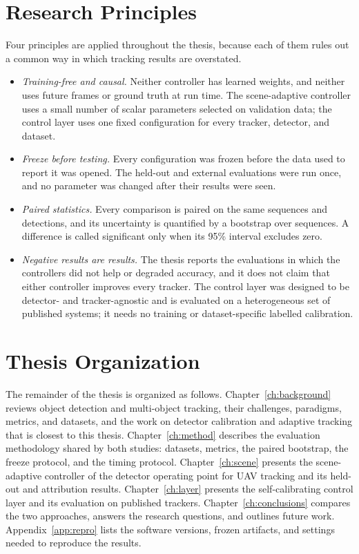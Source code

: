 \section{Research Principles}
Four principles are applied throughout the thesis, because each of them rules out a common way in which tracking results are overstated.
\begin{itemize}
\item \emph{Training-free and causal.} Neither controller has learned weights, and neither uses future frames or ground truth at run time. The scene-adaptive controller uses a small number of scalar parameters selected on validation data; the control layer uses one fixed configuration for every tracker, detector, and dataset.
\item \emph{Freeze before testing.} Every configuration was frozen before the data used to report it was opened. The held-out and external evaluations were run once, and no parameter was changed after their results were seen.
\item \emph{Paired statistics.} Every comparison is paired on the same sequences and detections, and its uncertainty is quantified by a bootstrap over sequences. A difference is called significant only when its 95\% interval excludes zero.
\item \emph{Negative results are results.} The thesis reports the evaluations in which the controllers did not help or degraded accuracy, and it does not claim that either controller improves every tracker. The control layer was designed to be detector- and tracker-agnostic and is evaluated on a heterogeneous set of published systems; it needs no training or dataset-specific labelled calibration.
\end{itemize}

\section{Thesis Organization}
The remainder of the thesis is organized as follows. Chapter~\ref{ch:background} reviews object detection and multi-object tracking, their challenges, paradigms, metrics, and datasets, and the work on detector calibration and adaptive tracking that is closest to this thesis. Chapter~\ref{ch:method} describes the evaluation methodology shared by both studies: datasets, metrics, the paired bootstrap, the freeze protocol, and the timing protocol. Chapter~\ref{ch:scene} presents the scene-adaptive controller of the detector operating point for UAV tracking and its held-out and attribution results. Chapter~\ref{ch:layer} presents the self-calibrating control layer and its evaluation on published trackers. Chapter~\ref{ch:conclusions} compares the two approaches, answers the research questions, and outlines future work. Appendix~\ref{app:repro} lists the software versions, frozen artifacts, and settings needed to reproduce the results.
